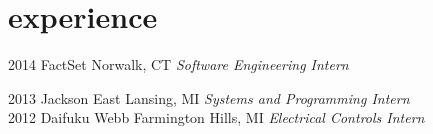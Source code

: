 \section{experience}

\begin{entrylist}
\entry
{2014}
{FactSet}
{Norwalk, CT}
{\emph{Software Engineering Intern} \\}

\entry
{2013}
{Jackson}
{East Lansing, MI}
{\emph{Systems and Programming Intern}\\}
\entry
{2012}
{Daifuku Webb}
{Farmington Hills, MI}
{\emph{Electrical Controls Intern} \\}
\end{entrylist}
